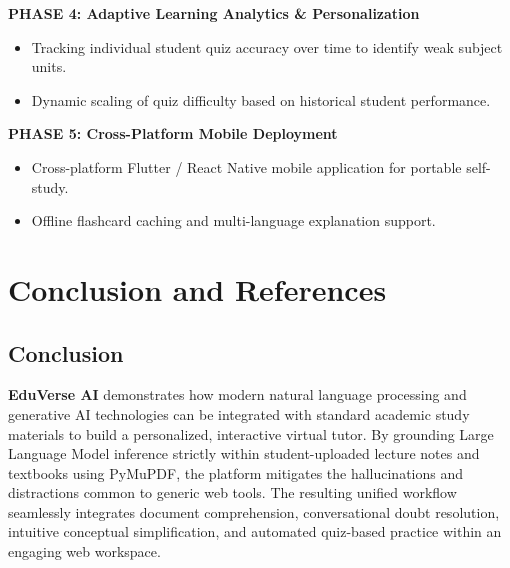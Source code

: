 \documentclass[11pt,a4paper]{report}
\begin{document}
\begin{mdframed}[linecolor=borderColor, backgroundcolor=white, innerleftmargin=10pt, innerrightmargin=10pt, innertopmargin=8pt, innerbottommargin=8pt]
\textbf{\color{icemNavy}PHASE 4: Adaptive Learning Analytics \& Personalization}
\begin{itemize}[noitemsep, topsep=2pt]
    \item Tracking individual student quiz accuracy over time to identify weak subject units.
    \item Dynamic scaling of quiz difficulty based on historical student performance.
\end{itemize}
\end{mdframed}

\begin{mdframed}[linecolor=borderColor, backgroundcolor=white, innerleftmargin=10pt, innerrightmargin=10pt, innertopmargin=8pt, innerbottommargin=8pt]
\textbf{\color{icemNavy}PHASE 5: Cross-Platform Mobile Deployment}
\begin{itemize}[noitemsep, topsep=2pt]
    \item Cross-platform Flutter / React Native mobile application for portable self-study.
    \item Offline flashcard caching and multi-language explanation support.
\end{itemize}
\end{mdframed}
\clearpage

\chapter{Conclusion and References}
\label{ch:conclusion}

\section{Conclusion}
\textbf{EduVerse AI} demonstrates how modern natural language processing and generative AI technologies can be integrated with standard academic study materials to build a personalized, interactive virtual tutor. By grounding Large Language Model inference strictly within student-uploaded lecture notes and textbooks using PyMuPDF, the platform mitigates the hallucinations and distractions common to generic web tools. The resulting unified workflow seamlessly integrates document comprehension, conversational doubt resolution, intuitive conceptual simplification, and automated quiz-based practice within an engaging web workspace.
\end{document}
